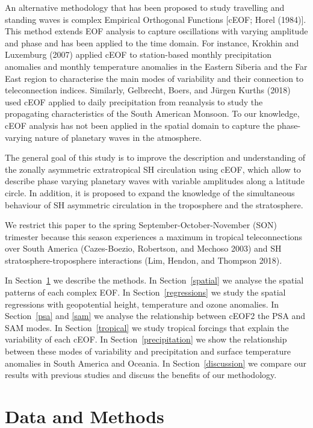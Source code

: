 \documentclass[smallextended]{svjour3}       %
\begin{document}
An alternative methodology that has been proposed to study travelling and standing waves is complex Empirical Orthogonal Functions {[}cEOF; Horel (1984){]}.
This method extends EOF analysis to capture oscillations with varying amplitude and phase and has been applied to the time domain.
For instance, Krokhin and Luxemburg (2007) applied cEOF to station-based monthly precipitation anomalies and monthly temperature anomalies in the Eastern Siberia and the Far East region to characterise the main modes of variability and their connection to teleconnection indices.
Similarly, Gelbrecht, Boers, and Jürgen Kurths (2018) used cEOF applied to daily precipitation from reanalysis to study the propagating characteristics of the South American Monsoon.
To our knowledge, cEOF analysis has not been applied in the spatial domain to capture the phase-varying nature of planetary waves in the atmosphere.

The general goal of this study is to improve the description and understanding of the zonally asymmetric extratropical SH circulation using cEOF, which allow to describe phase varying planetary waves with variable amplitudes along a latitude circle.
In addition, it is proposed to expand the knowledge of the simultaneous behaviour of SH asymmetric circulation in the troposphere and the stratosphere.

We restrict this paper to the spring September-October-November (SON) trimester because this season experiences a maximum in tropical teleconnections over South America (Cazes-Boezio, Robertson, and Mechoso 2003) and SH stratosphere-troposphere interactions (Lim, Hendon, and Thompson 2018).

In Section~\ref{methods} we describe the methods.
In Section~\ref{spatial} we analyse the spatial patterns of each complex EOF.
In Section~\ref{regressions} we study the spatial regressions with geopotential height, temperature and ozone anomalies.
In Section~\ref{psa} and \ref{sam} we analyse the relationship between cEOF2 the PSA and SAM modes.
In Section~\ref{tropical} we study tropical forcings that explain the variability of each cEOF.
In Section~\ref{precipitation} we show the relationship between these modes of variability and precipitation and surface temperature anomalies in South America and Oceania.
In Section~\ref{discussion} we compare our results with previous studies and discuss the benefits of our methodology.

\hypertarget{methods}{%
\section{Data and Methods}\label{methods}}
\end{document}
